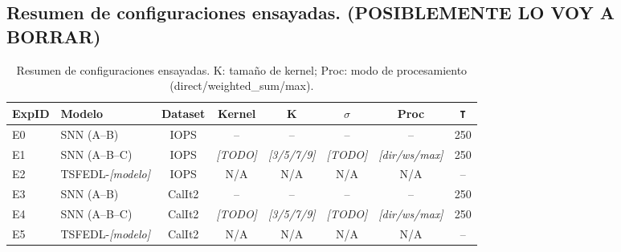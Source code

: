 \subsection{Resumen de configuraciones ensayadas. (POSIBLEMENTE LO VOY A BORRAR)}

\begin{table}[htbp]
\centering
\small
\begin{tabular}{llcccccc}
\hline\hline
\textbf{ExpID} & \textbf{Modelo} & \textbf{Dataset} & \textbf{Kernel} & \textbf{K} & \(\sigma\) & \textbf{Proc} & \texttt{T} \\
\hline
E0 & SNN (A--B) & IOPS & -- & -- & -- & -- & 250 \\
E1 & SNN (A--B--C) & IOPS & \textit{[TODO]} & \textit{[3/5/7/9]} & \textit{[TODO]} & \textit{[dir/ws/max]} & 250 \\
E2 & TSFEDL-\textit{[modelo]} & IOPS & N/A & N/A & N/A & N/A & -- \\
E3 & SNN (A--B) & CalIt2 & -- & -- & -- & -- & 250 \\
E4 & SNN (A--B--C) & CalIt2 & \textit{[TODO]} & \textit{[3/5/7/9]} & \textit{[TODO]} & \textit{[dir/ws/max]} & 250 \\
E5 & TSFEDL-\textit{[modelo]} & CalIt2 & N/A & N/A & N/A & N/A & -- \\
\hline\hline
\end{tabular}
\caption{Resumen de configuraciones ensayadas. K: tamaño de kernel; Proc: modo de procesamiento (direct/weighted\_sum/max).}
\label{tab:resumen-configuraciones}
\end{table}